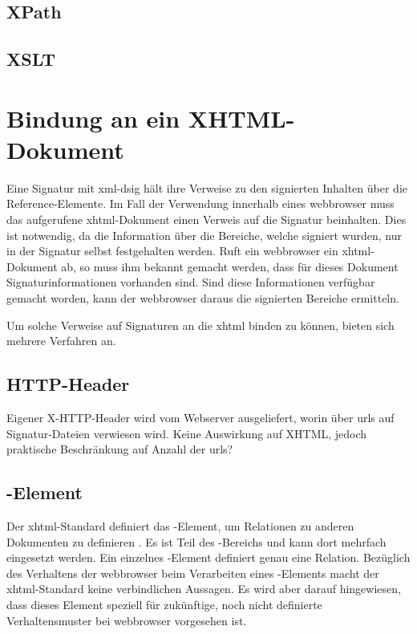 \subsection{XPath}
\label{sec:Signaturbindung:Transformationen:XPath}

\subsection{XSLT}
\label{sec:Signaturbindung:Transformationen:XSLT}


\section{Bindung an ein XHTML-Dokument}
Eine Signatur mit \gls{xml-dsig} hält ihre Verweise zu den signierten Inhalten über die Reference-Elemente. Im Fall der Verwendung innerhalb eines
\gls{webbrowser} muss das aufgerufene \gls{xhtml}-Dokument einen Verweis auf die Signatur beinhalten. Dies ist notwendig, da die Information über die Bereiche,
welche signiert wurden, nur in der Signatur selbst festgehalten werden. Ruft ein \gls{webbrowser} ein \gls{xhtml}-Dokument ab, so muss ihm bekannt gemacht
werden, dass für dieses Dokument Signaturinformationen vorhanden sind. Sind diese Informationen verfügbar gemacht worden, kann der \gls{webbrowser} daraus die
signierten Bereiche ermitteln.

Um solche Verweise auf Signaturen an die \gls{xhtml} binden zu können, bieten sich mehrere Verfahren an.

\subsection{HTTP-Header}
Eigener X-HTTP-Header wird vom Webserver ausgeliefert, worin über \glspl{url} auf Signatur-Dateien verwiesen wird. Keine Auswirkung auf XHTML, jedoch praktische Beschränkung
auf Anzahl der \glspl{url}?

\subsection{-Element}
Der \gls{xhtml}-Standard definiert das -Element, um Relationen zu anderen Dokumenten zu definieren \cite{xhtml:oreilly}. Es ist Teil des
-Bereichs und kann dort mehrfach eingesetzt werden. Ein einzelnes -Element definiert genau eine Relation. Bezüglich des Verhaltens
der \gls{webbrowser} beim Verarbeiten eines -Elements macht der \gls{xhtml}-Standard keine verbindlichen Aussagen. Es wird aber darauf
hingewiesen, dass dieses Element speziell für zukünftige, noch nicht definierte Verhaltensmuster bei \gls{webbrowser} vorgesehen ist.

